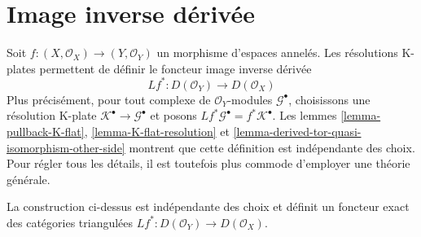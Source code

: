 \section{Image inverse dérivée}

\label{section-derived-pullback}

\noindent
Soit $f : (X, \mathcal{O}_X) \to (Y, \mathcal{O}_Y)$ un morphisme d'espaces annelés. Les résolutions K-plates permettent de définir le foncteur image inverse dérivée $$
Lf^* : D(\mathcal{O}_Y) \to D(\mathcal{O}_X)
$$ Plus précisément, pour tout complexe de $\mathcal{O}_Y$-modules $\mathcal{G}^\bullet$, choisissons une résolution K-plate $\mathcal{K}^\bullet \to \mathcal{G}^\bullet$ et posons $Lf^*\mathcal{G}^\bullet = f^*\mathcal{K}^\bullet$. Les lemmes \ref{lemma-pullback-K-flat}, \ref{lemma-K-flat-resolution} et \ref{lemma-derived-tor-quasi-isomorphism-other-side} montrent que cette définition est indépendante des choix. Pour régler tous les détails, il est toutefois plus commode d'employer une théorie générale.

\begin{lemma}

\label{lemma-derived-base-change}
La construction ci-dessus est indépendante des choix et définit un foncteur exact des catégories triangulées $Lf^* : D(\mathcal{O}_Y) \to D(\mathcal{O}_X)$.
\end{lemma}


